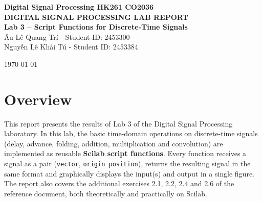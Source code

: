 \documentclass[12pt,a4paper]{article}
\begin{document}
\begin{center}
    \textbf{Digital Signal Processing \hfill HK261 \hfill CO2036}\\[2cm]

    \huge\textbf{DIGITAL SIGNAL PROCESSING LAB REPORT}\\[0.5cm]
    \Large\textbf{Lab 3 -- Script Functions for Discrete-Time Signals}\\[1cm]

    \large Âu Lê Quang Trí - Student ID: 2453300\\[0.5cm]
    \large Nguyễn Lê Khải Tú - Student ID: 2453384\\[0.5cm]
    \vspace{0.5cm}

    \large \today\\[2cm]
\end{center}

\section*{Overview}
This report presents the results of Lab 3 of the Digital Signal Processing laboratory. In this lab, the basic time-domain operations on discrete-time signals (delay, advance, folding, addition, multiplication and convolution) are implemented as reusable \textbf{Scilab script functions}. Every function receives a signal as a pair (\texttt{vector}, \texttt{origin position}), returns the resulting signal in the same format and graphically displays the input(s) and output in a single figure. The report also covers the additional exercises 2.1, 2.2, 2.4 and 2.6 of the reference document, both theoretically and practically on Scilab.
\end{document}
